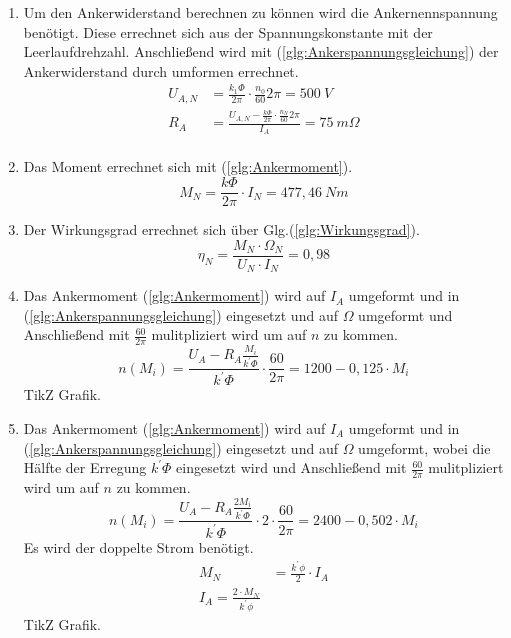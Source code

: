 \begin{solution}
\begin{enumerate}
\item Um den Ankerwiderstand berechnen zu können wird die Ankernennspannung benötigt. Diese errechnet sich aus der Spannungskonstante mit der Leerlaufdrehzahl. Anschließend wird mit (\ref{glg:Ankerspannungsgleichung}) der Ankerwiderstand durch umformen errechnet.\\
\begin{align}
U_{A,N} &= \frac{k_1 \Phi}{2 \pi} \cdot \frac{n_0}{60} 2 \pi = 500~V\\
R_A &= \frac{U_{A,N} - \frac{k \Phi}{2 \pi} \cdot \frac{n_N}{60} 2 \pi}{I_A}=75~m \Omega\\
\end{align}
\item Das Moment errechnet sich mit (\ref{glg:Ankermoment}).\\
\begin{equation}
M_N=\frac{k \Phi}{2 \pi} \cdot I_N =477,46~Nm
\end{equation}
\item Der Wirkungsgrad errechnet sich über Glg.(\ref{glg:Wirkungsgrad}).
\begin{equation}
\eta_N = \frac{M_N \cdot \Omega_N}{U_N \cdot I_N} =0,98
\end{equation}
\item Das Ankermoment (\ref{glg:Ankermoment}) wird auf $I_A$ umgeformt und in (\ref{glg:Ankerspannungsgleichung}) eingesetzt und auf $\Omega$ umgeformt und Anschließend mit $\frac{60}{2 \pi}$ mulitpliziert wird um auf $n$ zu kommen.
\begin{equation}
n(M_i) = \frac{U_A - R_A \frac{ M_i}{k^{'} \Phi}}{k^{'}\Phi} \cdot \frac{60}{2 \pi} =1200-0,125 \cdot M_i
\end{equation}
TikZ Grafik.\\
\item Das Ankermoment (\ref{glg:Ankermoment}) wird auf $I_A$ umgeformt und in (\ref{glg:Ankerspannungsgleichung}) eingesetzt und auf $\Omega$ umgeformt, wobei die Hälfte der Erregung $k^{'} \Phi$ eingesetzt wird und Anschließend mit $\frac{60}{2 \pi}$ mulitpliziert wird um auf $n$ zu kommen.
\begin{equation}
n(M_i) = \frac{U_A - R_A \frac{2 M_i}{k^{'} \Phi}}{k^{'}\Phi} \cdot 2 \cdot \frac{60}{2 \pi} =2400-0,502 \cdot M_i
\end{equation}
Es wird der doppelte Strom benötigt.
\begin{align}
M_N &= \frac{k^{'} \phi}{2} \cdot I_A\\
I_A = \frac{2 \cdot M_N}{k^{'} \phi}
\end{align}
TikZ Grafik.\\
\end{enumerate}
\end{solution}